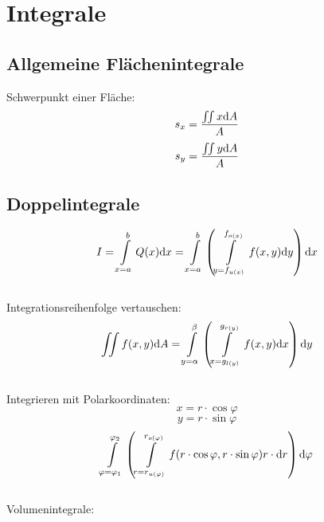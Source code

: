 



\chapter{Integrale}
\section{Allgemeine Flächenintegrale}
Schwerpunkt einer Fläche:
\[s_x=\frac{\iint x \mathrm{d} A}{A}\]
\[s_y=\frac{\iint y \mathrm{d} A}{A}\]

	
\section{Doppelintegrale}
\[ I= \int\limits_{x=a}^{b} Q(x) \mathrm{d} x=\int\limits_{x=a}^{b} \left( \int\limits_{y=f_{u(x)}}^{f_{o(x)}}f(x,y)\mathrm{d} y\right) \mathrm{d} x\]
\\
Integrationsreihenfolge vertauschen:
\[ \iint f(x,y)\mathrm{d} A=\int\limits_{y=\alpha}^{\beta} \left( \int\limits_{x=g_{l(y)}}^{g_{r(y)}}f(x,y)\mathrm{d} x\right) \mathrm{d} y\]
\\
Integrieren mit Polarkoordinaten:
\[x=r\cdot\cos \varphi\]
\[y=r\cdot\sin \varphi\]
\[ \int\limits_{\varphi=\varphi_1}^{\varphi_2} \left( \int\limits_{r=r_{u(\varphi)}}^{r_{o(\varphi)}}f(r\cdot\cos\varphi,r\cdot\sin\varphi )r\cdot\mathrm{d} r\right) \mathrm{d} \varphi\]
\\
Volumenintegrale: